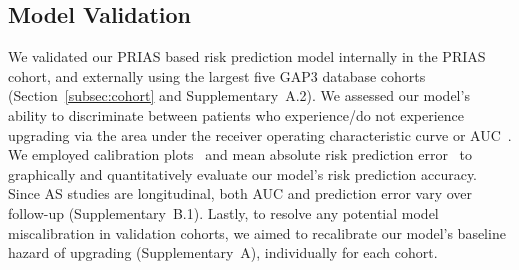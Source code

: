\subsection{Model Validation}
We validated our PRIAS based risk prediction model internally in the PRIAS cohort, and externally using the largest five GAP3 database cohorts (Section~\ref{subsec:cohort} and Supplementary~A.2). We assessed our model's ability to discriminate between patients who experience/do not experience upgrading via the area under the receiver operating characteristic curve or AUC~\citep{rizopoulos2017dynamic}. We employed calibration plots~\citep{royston2013external,steyerberg2010assessing} and mean absolute risk prediction error~\citep{rizopoulos2017dynamic} to graphically and quantitatively evaluate our model's risk prediction accuracy. Since AS studies are longitudinal, both AUC and prediction error vary over follow-up (Supplementary~B.1). Lastly, to resolve any potential model miscalibration in validation cohorts, we aimed to recalibrate our model's baseline hazard of upgrading (Supplementary~A), individually for each cohort.